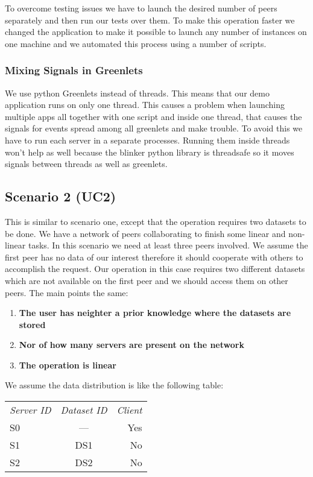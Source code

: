 To overcome testing issues we have to launch the desired number of peers separately and then run our tests 
over them. To make this operation faster we changed the application to make it possible to launch any number
of instances on one machine and we automated this process using a number of scripts. %

\subsubsection{Mixing Signals in Greenlets}
We use python Greenlets instead of threads. This means that our demo application runs on only one thread. 
This causes a problem when launching multiple apps all together with one script and inside one thread, that
causes the signals for events spread among all greenlets and make trouble. To avoid this we have to run
each server in a separate processes. Running them inside threads won't help as well because the blinker python
library is threadsafe so it moves signals between threads as well as greenlets.

\subsection{Scenario 2 (UC2)}
This is similar to scenario one, except that the operation requires two datasets to be done. We have a network of peers collaborating
to finish some linear and non-linear tasks. In this scenario we need at least three peers involved. We assume the first peer has no
data of our interest therefore it should cooperate with others to accomplish the request. Our operation in this case requires two 
different datasets which are not available on the first peer and we should access them on other peers. The main points the same:

\begin{enumerate}
\item \textbf{The user has neighter a prior knowledge where the datasets are stored}
\item \textbf{Nor of how many servers are present on the network}
\item \textbf{The operation is linear}
\end{enumerate}

We assume the data distribution is like the following table:

\begin{tabular}{ l c r }
\em{Server ID} & \em{ Dataset ID} & \em{ Client} \\
S0 & --- & Yes \\
S1 & DS1 & No \\
S2 & DS2 & No \\
\end{tabular}\\

